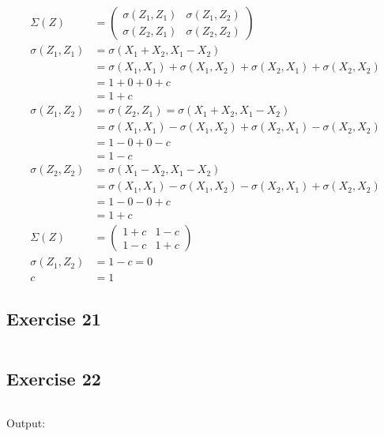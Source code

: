 \documentclass{article}
\begin{document}
\begin{align*}
    \Sigma(Z) &= \left(\begin{matrix}\sigma(Z_1, Z_1) & \sigma(Z_1, Z_2) \\
\sigma(Z_2, Z_1) & \sigma(Z_2, Z_2)\end{matrix}\right) \\
    \sigma(Z_1, Z_1) &= \sigma(X_1 + X_2, X_1 - X_2) \\
                     &= \sigma(X_1, X_1) + \sigma(X_1, X_2) + \sigma(X_2, X_1) +
    \sigma(X_2, X_2) \\
    &= 1 + 0 + 0 + c \\
    &= 1 + c \\
    \sigma(Z_1, Z_2) &= \sigma(Z_2, Z_1) = \sigma(X_1 + X_2, X_1 - X_2) \\
                     &= \sigma(X_1, X_1) - \sigma(X_1, X_2) + \sigma(X_2, X_1)
    - \sigma(X_2, X_2) \\
    &= 1 - 0 + 0 - c \\
    &= 1 - c \\
    \sigma(Z_2, Z_2) &= \sigma(X_1 - X_2, X_1 - X_2) \\
                     &= \sigma(X_1, X_1) - \sigma(X_1, X_2) - \sigma(X_2, X_1) +
    \sigma(X_2, X_2) \\
    &= 1 - 0 - 0 + c \\
    &= 1 + c \\
\Sigma(Z) &= \left(\begin{matrix}1 + c & 1 - c \\ 1 - c & 1 +
c\end{matrix}\right) \\
\sigma(Z_1, Z_2) &= 1 - c = 0 \\
c &= 1
\end{align*}

\subsection{Exercise 21}

\inputminted{python}{variance_21.py}



\newpage

\subsection{Exercise 22}

\inputminted{python}{variance_22.py}

Output:
\end{document}
